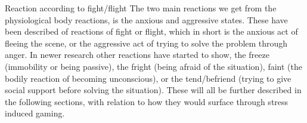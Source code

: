 Reaction according to fight/flight
The two main reactions we get from the physiological body reactions, is the anxious and aggressive states. These have been described of reactions of fight or flight, which in short is the anxious act of fleeing the scene, or the aggressive act of trying to solve the problem through anger. In newer research other reactions have started to show, the freeze (immobility or being passive), the fright (being afraid of the situation), faint (the bodily reaction of becoming unconscious), or the tend/befriend (trying to give social support before solving the situation).
These will all be further described in the following sections, with relation to how they would surface through stress induced gaming. \cite{Bracha, H. S. Freeze, flight, fight, fright, faint: adaptationist perspectives on the acute stress response spectrum.} \cite{Biobehavioral Responses to Stress in Females:
Tend-and-Befriend, not Fight-or-Flight}